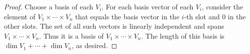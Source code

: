 \begin{proof}
Choose a basis of each $V_i$. For each basis vector of each $V_i$, consider the element of $V_1\times\cdots\times V_n$ that equals the basis vector in the $i$-th slot and $0$ in the other slots. 
The set of all such vectors is linearly independent and spans $V_1\times\cdots\times V_n$.
Thus it is a basis of $V_1\times\cdots\times V_n$. 
The length of this basis is $\dim V_1+\cdots+\dim V_n$, as desired.

\begin{comment}
For each $V_k$ ($k=1,\dots,n$), choose a basis:
\[\mathcal{B}_k=\crbrac{e_{k1},\dots,e_{k\dim V_k}}.\]
For each basis vector of each $V_k$, consider the set consisting of elements of $V_1\times\cdots\times V_n$ that equal the basis vector in the $k$-th slot and $0$ in the other slots:
\[\mathcal{B}=\{(0,\dots,\underbrace{e_{ki}}_\text{$k$-th slot},\dots,0)\mid 1\le i\le\dim V_k,1\le k\le n\}.\]

We want to show that $\mathcal{B}$ is a basis of $V_1\times\cdots\times V_n$. Thus we need to show that it is (i) a spanning set, and (ii) linearly independent.
\begin{enumerate}[label=(\roman*)]
\item Let $(v_1,\dots,v_n)\in V_1\times\cdots\times V_n$. For $k=1,\dots,n$, since $\mathcal{B}_k$ is a basis for $V_k$, we can write
\[v_k=\sum_{i=1}^{\dim V_k}a_{ki}e_{ki}.\]
for some $a_{k1},\dots,a_{k\dim V_k}\in\FF$. Then
\begin{align*}
(v_1,\dots,v_n)
&=\sum_{k=1}^{n}(0,\dots,v_k,\dots,0)\\
&=\sum_{k=1}^{n}\brac{0,\dots,\sum_{i=1}^{\dim V_k}a_{ki}e_{ki},\dots,0}\\
&=\sum_{k=1}^{n}\sum_{i=1}^{\dim V_k}a_{ki}\brac{0,\dots,e_{ki},\dots,0}
\end{align*}
which is a linear combination of vectors in $\mathcal{B}$. Hence $\mathcal{B}$ spans $V_1\times\cdots\times V_n$.

\item Suppose there exist $a_{ki}\in\FF$ such that
\begin{align*}
\sum_{k=1}^{n}\sum_{i=1}^{\dim V_k}a_{ki}\brac{0,\dots,e_{ki},\dots,0}&=\vb{0}\\
\sum_{k=1}^{n}\brac{0,\dots,\sum_{i=1}^{\dim V_k}a_{ki}e_{ki},\dots,0}&=\vb{0}\\
\brac{\sum_{i=1}^{\dim V_1}a_{1i}e_{1i},\sum_{i=1}^{\dim V_2}a_{2i}e_{2i},\dots,\sum_{i=1}^{\dim V_n}a_{ni}e_{ni}}&=\vb{0}
\end{align*}
so for $k=1,\dots,n$,
\[\sum_{i=1}^{\dim V_k}a_{ki}e_{ki}=\vb{0}.\]
By the linear independence of vectors in $\mathcal{B}_k$, we have that
\[a_{k1}=\cdots=a_{k\dim V_k}=0\]
for $k=1,\dots,n$.
\end{enumerate}


\end{comment}
\end{proof}

